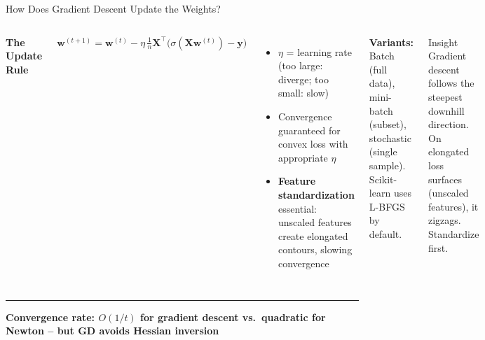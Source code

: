 \documentclass[8pt,aspectratio=169]{beamer}
\newcommand{\bottomnote}[1]{%
\vfill
\vspace{-2mm}
\textcolor{mllavender2}{\rule{\textwidth}{0.4pt}}
\vspace{1mm}
\footnotesize
\textbf{#1}
}
\newenvironment{compactlist}{%
  \begin{itemize}%
    \setlength{\itemsep}{2pt}%
    \setlength{\parskip}{0pt}%
    \setlength{\parsep}{0pt}%
}{%
  \end{itemize}%
}
\begin{document}
\begin{frame}[t]{How Does Gradient Descent Update the Weights?}
\begin{columns}[T]
\small
\textbf{The Update Rule}

\scriptsize
$\displaystyle \mathbf{w}^{(t+1)} = \mathbf{w}^{(t)} - \eta\,\frac{1}{n}\mathbf{X}^\top\!\bigl(\sigma(\mathbf{X}\mathbf{w}^{(t)}) - \mathbf{y}\bigr)$

\vspace{2mm}
\begin{compactlist}
\item $\eta$ = learning rate (too large: diverge; too small: slow)
\item Convergence guaranteed for convex loss with appropriate $\eta$
\item \textbf{Feature standardization} essential: unscaled features create elongated contours, slowing convergence
\end{compactlist}

\vspace{1mm}
\scriptsize
\textbf{Variants:} Batch (full data), mini-batch (subset), stochastic (single sample). Scikit-learn uses L-BFGS by default.

\begin{block}{Insight}
\scriptsize Gradient descent follows the steepest downhill direction. On elongated loss surfaces (unscaled features), it zigzags. Standardize first.
\end{block}

\end{columns}

\bottomnote{Convergence rate: $O(1/t)$ for gradient descent vs.\ quadratic for Newton -- but GD avoids Hessian inversion}
\end{frame}
\end{document}
